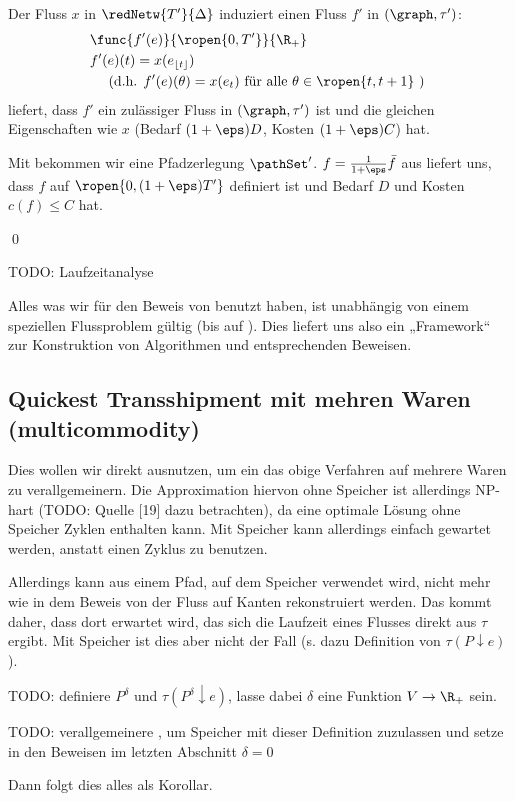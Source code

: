 \begin{standaloneProof}
    Der Fluss $x$ in $\redNetw{T'}{\Delta}$ induziert einen Fluss $f'$ in
    $(\graph, \tau')$:
    \begin{align*}
        & \func{f'(e)}{\ropen{0,T'}}{\R_+} \\
        & f'(e)(t) = x(e_{\lfloor t \rfloor}) \\
        & \quad \text{ (d.h. } f'(e)(\theta) = x(e_t)
            \text{ für alle } \theta \in \ropen{t, t+1} \text{ ) }
    \end{align*}
     liefert, dass $f'$ ein zulässiger Fluss in
    $(\graph, \tau')$ ist und die gleichen Eigenschaften wie $x$
    (Bedarf $(1+\eps)D$, Kosten $(1+\eps)C$) hat.
    
    Mit  bekommen wir eine Pfadzerlegung $\pathSet'$.
    $f = \frac{1}{1+\eps} \bar{f}$ aus  liefert uns, dass
    $f$ auf $\ropen{0, (1 + \eps)T'}$ definiert ist und Bedarf $D$ und Kosten
    $c(f) \leq C$ hat.
    \begin{flushright}\qed \end{flushright}
\end{standaloneProof}

TODO: Laufzeitanalyse

\begin{remark}
    Alles was wir für den Beweis von  benutzt haben, ist
    unabhängig von einem speziellen Flussproblem gültig
    (bis auf ). Dies liefert uns also ein „Framework“
    zur Konstruktion von Algorithmen und entsprechenden Beweisen.
\end{remark}

\subsection*{Quickest Transshipment mit mehren Waren (multicommodity)}
Dies wollen wir direkt ausnutzen, um ein das obige Verfahren auf mehrere
Waren zu verallgemeinern. Die Approximation hiervon ohne Speicher ist allerdings
NP-hart (TODO: Quelle [19] dazu betrachten), da eine optimale Lösung ohne Speicher
Zyklen enthalten kann. Mit Speicher kann allerdings einfach gewartet werden,
anstatt einen Zyklus zu benutzen.

Allerdings kann aus einem Pfad, auf dem Speicher verwendet wird, nicht mehr wie
in dem Beweis von  der Fluss auf Kanten rekonstruiert werden.
Das kommt daher, dass dort erwartet wird, das sich die Laufzeit eines Flusses
direkt aus $\tau$ ergibt. Mit Speicher ist dies aber nicht der Fall
(s. dazu Definition von $\tau(P \downarrow e)$).

TODO: definiere $P^\delta$ und $\tau(P^\delta \downarrow e)$, lasse dabei $\delta$
eine Funktion $V \to \R_+$ sein.

TODO: verallgemeinere , um Speicher mit dieser Definition zuzulassen
und setze in den Beweisen im letzten Abschnitt $\delta = 0$

Dann folgt dies alles als Korollar.


